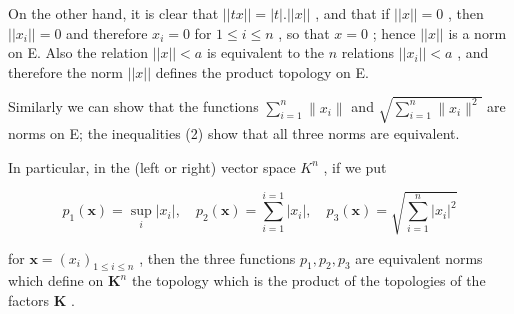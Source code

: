 On the other hand, it is clear that \(||tx|| = |t|.||x||\) , and that if \(||x|| = 0\) , then \(||x_i|| = 0\) and therefore \(x_i = 0\) for \(1 \leqslant i \leqslant n\) , so that \(x = 0\) ; hence \(||x||\) is a norm on E. Also the relation \(||x|| < a\) is equivalent to the \(n\) relations \(||x_i|| < a\) , and therefore the norm \(||x||\) defines the product topology on E.

Similarly we can show that the functions \(\sum_{i=1}^{n} \|x_i\|\) and \(\sqrt{\sum_{i=1}^{n} \|x_i\|^2}\) are norms on E; the inequalities (2) show that all three norms are equivalent.

In particular, in the (left or right) vector space \(K^{n}\) , if we put

\[
p _ {1} (\boldsymbol {x}) = \sup _ {i} | x _ {i} |, \quad p _ {2} (\boldsymbol {x}) = \sum_ {i = 1} ^ {i = 1} | x _ {i} |, \quad p _ {3} (\boldsymbol {x}) = \sqrt {\sum_ {i = 1} ^ {n} | x _ {i} | ^ {2}}
\]

for \(\pmb{x} = (x_{i})_{1\leqslant i\leqslant n}\) , then the three functions \(p_1, p_2, p_3\) are equivalent norms which define on \(\mathbf{K}^n\) the topology which is the product of the topologies of the factors \(\mathbf{K}\) .

